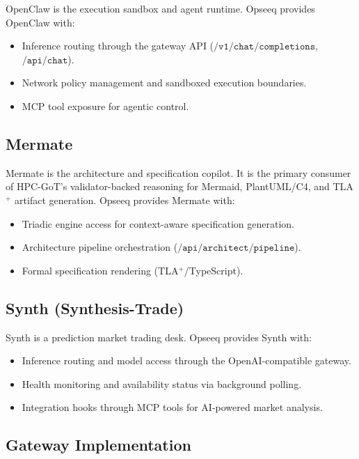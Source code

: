\documentclass[11pt]{article}
\theoremstyle{remark}
\begin{document}
OpenClaw is the execution sandbox and agent runtime. Opseeq provides OpenClaw with:
\begin{itemize}
  \item Inference routing through the gateway API ($\texttt{/v1/chat/completions}$, $\texttt{/api/chat}$).
  \item Network policy management and sandboxed execution boundaries.
  \item MCP tool exposure for agentic control.
\end{itemize}

\subsection{Mermate}
\label{subsec:mermate}

Mermate is the architecture and specification copilot. It is the primary consumer of HPC-GoT's validator-backed reasoning for Mermaid, PlantUML/C4, and TLA$^+$ artifact generation. Opseeq provides Mermate with:
\begin{itemize}
  \item Triadic engine access for context-aware specification generation.
  \item Architecture pipeline orchestration ($\texttt{/api/architect/pipeline}$).
  \item Formal specification rendering (TLA$^+$/TypeScript).
\end{itemize}

\subsection{Synth (Synthesis-Trade)}
\label{subsec:synth}

Synth is a prediction market trading desk. Opseeq provides Synth with:
\begin{itemize}
  \item Inference routing and model access through the OpenAI-compatible gateway.
  \item Health monitoring and availability status via background polling.
  \item Integration hooks through MCP tools for AI-powered market analysis.
\end{itemize}

\subsection{Gateway Implementation}
\label{subsec:gateway}
\end{document}
